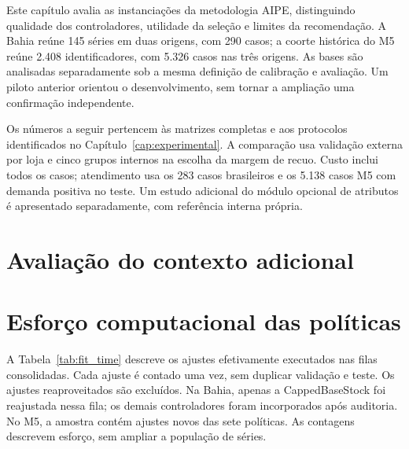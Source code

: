 
Este capítulo avalia as instanciações da metodologia AIPE, distinguindo qualidade dos controladores, utilidade da seleção e limites da recomendação. A Bahia reúne 145 séries em duas origens, com 290 casos; a coorte histórica do M5 reúne 2.408 identificadores, com 5.326 casos nas três origens. As bases são analisadas separadamente sob a mesma definição de calibração e avaliação. Um piloto anterior orientou o desenvolvimento, sem tornar a ampliação uma confirmação independente.

Os números a seguir pertencem às matrizes completas e aos protocolos identificados no Capítulo~\ref{cap:experimental}. A comparação usa validação externa por loja e cinco grupos internos na escolha da margem de recuo. Custo inclui todos os casos; atendimento usa os 283 casos brasileiros e os 5.138 casos M5 com demanda positiva no teste. Um estudo adicional do módulo opcional de atributos é apresentado separadamente, com referência interna própria.



\section{Avalia\c{c}\~ao do contexto adicional}


\section{Esforço computacional das políticas}
\label{sec:computational_results}
A Tabela~\ref{tab:fit_time} descreve os ajustes efetivamente executados nas filas consolidadas. Cada ajuste é contado uma vez, sem duplicar validação e teste. Os ajustes reaproveitados são excluídos. Na Bahia, apenas a CappedBaseStock foi reajustada nessa fila; os demais controladores foram incorporados após auditoria. No M5, a amostra contém ajustes novos das sete políticas. As contagens descrevem esforço, sem ampliar a população de séries.

